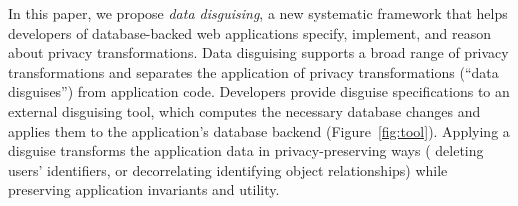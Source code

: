 %
%
%
%
%

%
%



%
In this paper, we propose \emph{data disguising}, a new systematic framework that helps developers
of database-backed web applications specify, implement, and reason about privacy transformations.
%
Data disguising supports a broad range of privacy transformations and separates the application
of privacy transformations (``data disguises'') from application code.
%
Developers provide disguise specifications to an external disguising tool, which computes the necessary
database changes and applies them to the application's database backend (Figure~\ref{fig:tool}).
%
Applying a disguise transforms the application data in privacy-preserving ways (\eg
deleting users' identifiers, or decorrelating identifying object relationships) while preserving
application invariants and utility.
%


